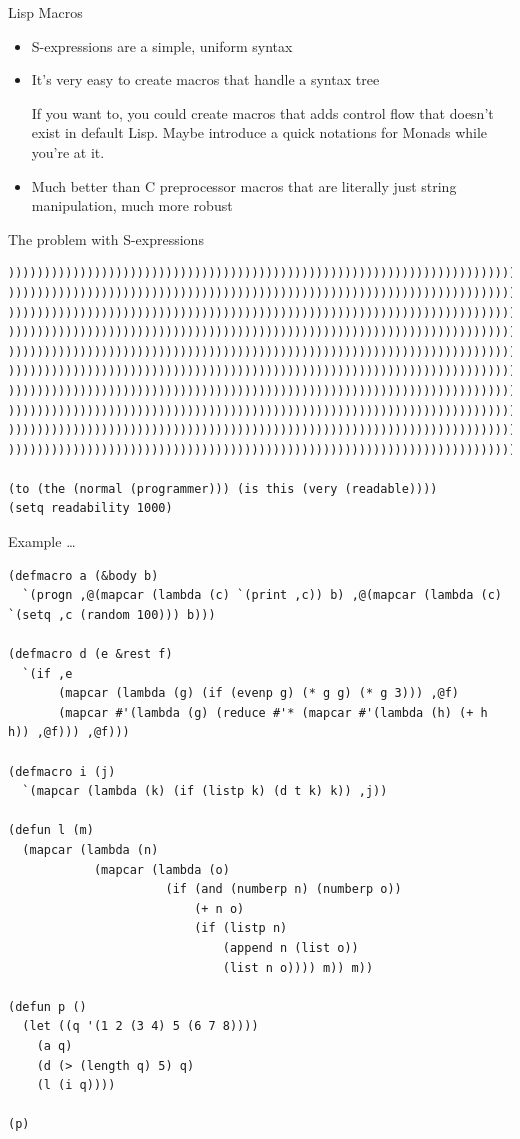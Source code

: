 \documentclass[aspectratio=169]{beamer}
\begin{document}
\begin{frame}{Lisp Macros}
	\begin{itemize}
		\item S-expressions are a simple, uniform syntax
		\item It's very easy to create macros that handle a syntax tree
			
			If you want to, you could create macros that adds control flow that doesn't exist in default Lisp. Maybe introduce a quick notations for Monads while you're at it.
		\item Much better than C preprocessor macros that are literally just string manipulation, much more robust
	\end{itemize}
\end{frame}

\begin{frame}[fragile]{The problem with S-expressions}
	\begin{verbatim}
))))))))))))))))))))))))))))))))))))))))))))))))))))))))))))))))))))))))
))))))))))))))))))))))))))))))))))))))))))))))))))))))))))))))))))))))))
))))))))))))))))))))))))))))))))))))))))))))))))))))))))))))))))))))))))
))))))))))))))))))))))))))))))))))))))))))))))))))))))))))))))))))))))))
))))))))))))))))))))))))))))))))))))))))))))))))))))))))))))))))))))))))
))))))))))))))))))))))))))))))))))))))))))))))))))))))))))))))))))))))))
))))))))))))))))))))))))))))))))))))))))))))))))))))))))))))))))))))))))
))))))))))))))))))))))))))))))))))))))))))))))))))))))))))))))))))))))))
))))))))))))))))))))))))))))))))))))))))))))))))))))))))))))))))))))))))
))))))))))))))))))))))))))))))))))))))))))))))))))))))))))))))))))))))))

(to (the (normal (programmer))) (is this (very (readable))))
(setq readability 1000)
	\end{verbatim}
\end{frame}

\begin{frame}[fragile]{Example \ldots}
	\tiny
	\begin{verbatim}
(defmacro a (&body b)
  `(progn ,@(mapcar (lambda (c) `(print ,c)) b) ,@(mapcar (lambda (c) `(setq ,c (random 100))) b)))

(defmacro d (e &rest f)
  `(if ,e
       (mapcar (lambda (g) (if (evenp g) (* g g) (* g 3))) ,@f)
       (mapcar #'(lambda (g) (reduce #'* (mapcar #'(lambda (h) (+ h h)) ,@f))) ,@f)))

(defmacro i (j)
  `(mapcar (lambda (k) (if (listp k) (d t k) k)) ,j))

(defun l (m) 
  (mapcar (lambda (n) 
            (mapcar (lambda (o) 
                      (if (and (numberp n) (numberp o)) 
                          (+ n o) 
                          (if (listp n) 
                              (append n (list o)) 
                              (list n o)))) m)) m))

(defun p ()
  (let ((q '(1 2 (3 4) 5 (6 7 8))))
    (a q)
    (d (> (length q) 5) q)
    (l (i q))))

(p)
	\end{verbatim}
\end{frame}
\end{document}

